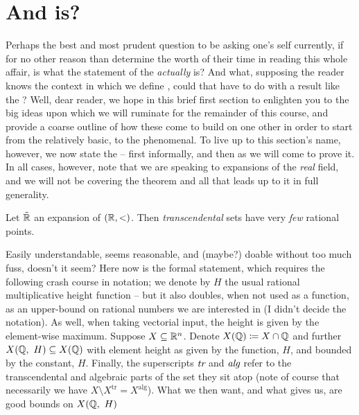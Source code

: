 \section{And \pw is?}
\noindent Perhaps the best and most prudent question to be asking one's self currently, if for no other reason than determine the worth of their time in reading this whole affair, is what the statement of the \pwt \emph{actually} is? And what, supposing the reader knows the context in which we define \omy, could that have to do with a \ntc result like the \pwt? Well, dear reader, we hope in this brief first section to enlighten you to the big ideas upon which we will ruminate for the remainder of this course, and provide a coarse outline of how these come to build on one other in order to start from the relatively basic, to the phenomenal. To live up to this section's name, however, we now state the \pwt -- first informally, and then as we will come to prove it. In all cases, however, note that we are speaking to \om expansions of the \emph{real} field, and we will not be covering the theorem and all that leads up to it in full generality.

\begin{theorem}
  \label{thm:pwt_informal}
  Let $\tilde{\mathbb{R}}$ an \om expansion of $(\mathbb{R}, <)$. Then \emph{transcendental}  sets have very \emph{few} rational points.
\end{theorem}

Easily understandable, seems reasonable, and (maybe?) doable without too much fuss, doesn't it seem? Here now is the formal statement, which requires the following crash course in notation; we denote by $H$ the usual rational multiplicative height function -- but it also doubles, when not used as a function, as an upper-bound on rational numbers we are interested in (I didn't decide the notation). As well, when taking vectorial input, the height is given by the element-wise maximum. Suppose $X \subseteq \mathbb{R}^n$. Denote $X(\mathbb{Q}) \coloneqq X \cap \mathbb{Q}$ and further $X(\mathbb{Q}, \ H) \subseteq X(\mathbb{Q})$ with element height as given by the function, $H$, and bounded by the constant, $H$. Finally, the superscripts $\emph{tr}$ and $\emph{alg}$ refer to the transcendental and algebraic parts of the set they sit atop (note of course that necessarily we have $X \setminus X^{\textrm{tr}} = X^{\textrm{alg}}$). What we then want, and what \pw gives us, are good bounds on $X(\mathbb{Q}, \ H)$

